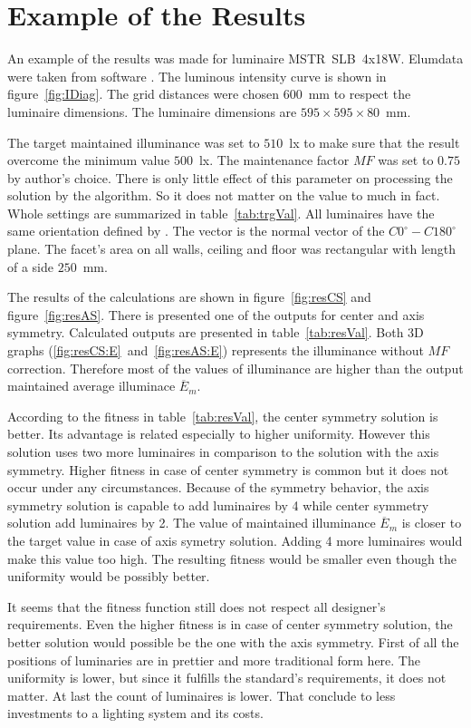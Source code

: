 \section{Example of the Results}

An example of the results was made for luminaire MSTR~SLB~4x18W. Elumdata were taken from software . The luminous intensity curve is shown in figure~\ref{fig:IDiag}. The grid distances were chosen $600$~mm to respect the luminaire dimensions. The luminaire dimensions are $595\times 595\times 80$~mm.

The target maintained illuminance was set to $510$~lx to make sure that the result overcome the minimum value $500$~lx. The maintenance factor $MF$ was set  to $0.75$ by author's choice. There is only little effect of this parameter on processing the solution by the algorithm. So it does not matter on the value to much in fact. Whole settings are summarized in table~\ref{tab:trgVal}. All luminaires have the same orientation defined by . The vector is the normal vector of the $C0^\circ-C180^\circ$ plane. The facet's area on all walls, ceiling and floor was rectangular with length of a side $250$~mm.

The results of the calculations are shown in figure~\ref{fig:resCS} and figure~\ref{fig:resAS}. There is presented one of the outputs for center and axis symmetry.  Calculated outputs are presented in table~\ref{tab:resVal}. Both 3D graphs (\ref{fig:resCS:E}~and~\ref{fig:resAS:E}) represents the illuminance without $MF$ correction. Therefore most of the values of illuminance are higher than the output maintained average illuminace $\overline{E}_{m}$.

According to the fitness in table~\ref{tab:resVal}, the center symmetry solution is better. Its advantage is related especially to higher uniformity. However this solution uses two more luminaires in comparison to the solution with the axis symmetry. Higher fitness in case of center symmetry is common but it does not occur under any circumstances. Because of the symmetry behavior, the axis symmetry solution is capable to add luminaires by 4 while center symmetry solution add luminaires by 2. The value of maintained illuminance $\overline{E}_{m}$ is closer to the target value in case of axis symetry solution. Adding 4 more luminaires would make this value too high. The resulting fitness would be smaller even though the uniformity would be possibly better.

It seems that the fitness function still does not respect all designer's requirements. Even the higher fitness is in case of center symmetry solution, the better solution would possible be the one with the axis symmetry. First of all the positions of luminaries are in prettier and more traditional form here. The uniformity is lower, but since it fulfills the standard's requirements, it does not matter. At last the count of luminaires is lower. That conclude to less investments to a lighting system and its costs.

